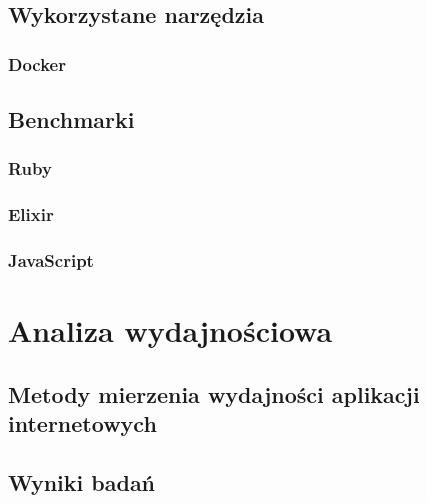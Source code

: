 \documentclass[mgr,oneside]{mgr}
\begin{document}
\section{Wykorzystane narzędzia}
\subsection{Docker}
\section{Benchmarki}
\subsection{Ruby}
\subsection{Elixir}
\subsection{JavaScript}

\chapter{Analiza wydajnościowa}
\label{cha:analiza_wydajnosciowa}
\section{Metody mierzenia wydajności aplikacji internetowych}
\section{Wyniki badań}
\end{document}
